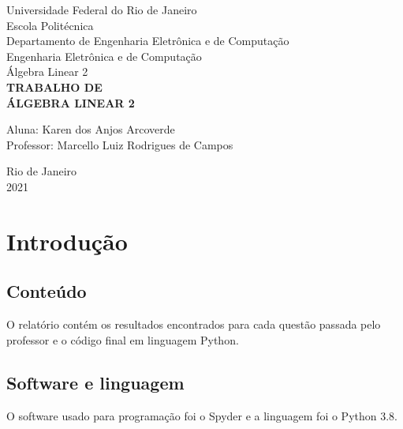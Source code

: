 \documentclass[a4paper,12pt,twoside]{article}
\date{}
\begin{document}
\begin{titlepage} %
\begin{center} %
{\large Universidade Federal do Rio de Janeiro}\\[0.2cm] %
{\large Escola Politécnica}\\[0.2cm] %
{\large Departamento de Engenharia Eletrônica e de Computação}\\[0.2cm]
{\large Engenharia Eletrônica e de Computação}\\[0.2cm]
{\large Álgebra Linear 2}\\[5.1cm]
{\bf \huge TRABALHO DE}\\ %
{\bf \huge ÁLGEBRA LINEAR 2}\\[5.1cm] 
\end{center} %
{\large Aluna: Karen dos Anjos Arcoverde}\\[0.7cm] %
{\large Professor: Marcello Luiz Rodrigues de Campos}\\[5.1cm]
\begin{center}
{\large Rio de Janeiro}\\[0.2cm]
{\large 2021}
\end{center}
\end{titlepage} %


\renewcommand{\contentsname}{Sumário}

\tableofcontents
\clearpage





\section{Introdução}
\subsection{Conteúdo}
    O relatório contém os resultados encontrados para cada questão passada pelo professor e o código final em linguagem Python.
\subsection{Software e linguagem}
    O software usado para programação foi o Spyder e a linguagem foi o Python 3.8.
\end{document}
